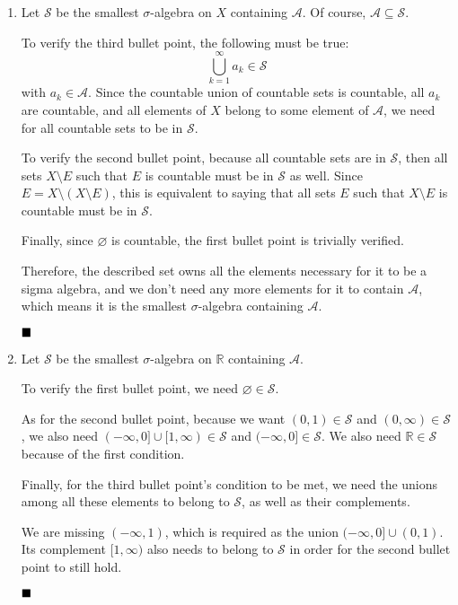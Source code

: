 \documentclass[11pt, a4paper, tikz]{article}
\renewcommand{\qed}{\hfill\blacksquare}
\newcommand{\reals}{
	\ensuremath{\mathbb{R}}
}
\newcommand{\sigmaAlgebra}[1]{
	\ensuremath{\mathcal{#1}}
}
\begin{document}
		\begin{enumerate}[label=\alph*)]
		\item Let $\sigmaAlgebra{S}$ be the smallest $\sigma$-algebra on $X$ containing $\mathcal{A}$. Of course, $\mathcal{A}\subseteq\sigmaAlgebra{S}$.
		
		To verify the third bullet point, the following must be true: \[\bigcup_{k=1}^{\infty}a_k\in\sigmaAlgebra{S}\] with $a_k\in\mathcal{A}$. Since the countable union of countable sets is countable, all $a_k$ are countable, and all elements of $X$ belong to some element of $\mathcal{A}$, we need for all countable sets to be in $\sigmaAlgebra{S}$.
		
		To verify the second bullet point, because all countable sets are in $\sigmaAlgebra{S}$, then all sets $X\setminus E$ such that $E$ is countable must be in $\sigmaAlgebra{S}$ as well. Since $E = X\setminus(X\setminus E)$, this is equivalent to saying that all sets $E$ such that $X\setminus E$ is countable must be in $\sigmaAlgebra{S}$.
		
		Finally, since $\varnothing$ is countable, the first bullet point is trivially verified.
		
		Therefore, the described set owns all the elements necessary for it to be a sigma algebra, and we don't need any more elements for it to contain $\mathcal{A}$, which means it is the smallest $\sigma$-algebra containing $\mathcal{A}$.
		
		$\qed$
		
		\item Let $\sigmaAlgebra{S}$ be the smallest $\sigma$-algebra on $\reals$ containing $\mathcal{A}$.
		
		To verify the first bullet point, we need $\varnothing\in\sigmaAlgebra{S}$.
		
		As for the second bullet point, because we want $(0,1)\in\sigmaAlgebra{S}$ and $(0,\infty)\in\sigmaAlgebra{S}$, we also need $(-\infty,0]\cup[1,\infty)\in\sigmaAlgebra{S}$ and $(-\infty,0]\in\sigmaAlgebra{S}$. We also need $\reals\in\sigmaAlgebra{S}$ because of the first condition.
		
		Finally, for the third bullet point's condition to be met, we need the unions among all these elements to belong to $\sigmaAlgebra{S}$, as well as their complements.
		
		We are missing $(-\infty, 1)$, which is required as the union $(-\infty,0]\cup(0,1)$. Its complement $[1,\infty)$ also needs to belong to $\sigmaAlgebra{S}$ in order for the second bullet point to still hold.
		
		$\qed$
	\end{enumerate}
\end{document}
